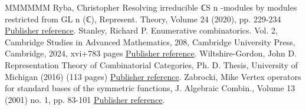 \begin{thebibliography}{MMMMMM}
 Ryba, Christopher Resolving irreducible ℂS n -modules by modules restricted from GL n (ℂ), Represent. Theory, Volume 24 (2020), pp. 229-234 \href{https://alco.centre-mersenne.org/articles/10.5802/alco.365/#MR4127906}{Publisher reference}.
 Stanley, Richard P. Enumerative combinatorics. Vol. 2, Cambridge Studies in Advanced Mathematics, 208, Cambridge University Press, Cambridge, 2024, xvi+783 pages \href{https://alco.centre-mersenne.org/articles/10.5802/alco.365/#MR4621625}{Publisher reference}.
 Wiltshire-Gordon, John D. Representation Theory of Combinatorial Categories, Ph. D. Thesis, University of Michigan (2016) (113 pages) \href{https://alco.centre-mersenne.org/articles/10.5802/alco.365/#MR3641124}{Publisher reference}.
 Zabrocki, Mike Vertex operators for standard bases of the symmetric functions, J. Algebraic Combin., Volume 13 (2001) no. 1, pp. 83-101 \href{https://alco.centre-mersenne.org/articles/10.5802/alco.365/#MR1817706}{Publisher reference}.
\end{thebibliography}
